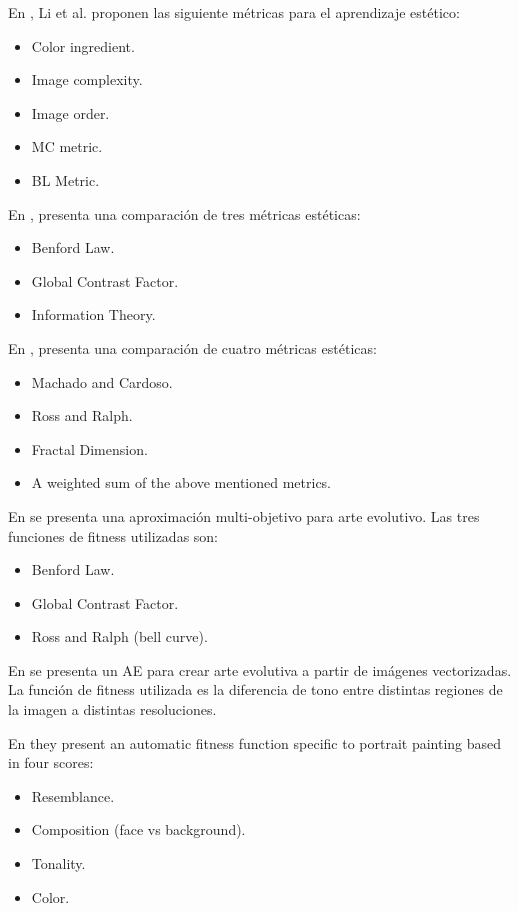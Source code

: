 \documentclass[conference]{IEEEtran}
\begin{document}
En \cite{li2012investigating}, Li et al. proponen las siguiente métricas para el aprendizaje estético:
\begin{itemize}
	\item Color ingredient.
	\item Image complexity.
	\item Image order.
	\item MC metric.
	\item BL Metric.
\end{itemize}

En \cite{den2010using}, presenta una comparación de tres métricas estéticas:
\begin{itemize}
	\item Benford Law.
	\item Global Contrast Factor.
	\item Information Theory.
\end{itemize}

En \cite{den2010comparing}, presenta una comparación de cuatro métricas estéticas:
\begin{itemize}
	\item Machado and Cardoso.
	\item Ross and Ralph.
	\item Fractal Dimension.
	\item A weighted sum of the above mentioned metrics.
\end{itemize}

En \cite{den2011evolving} se presenta una aproximación multi-objetivo para arte evolutivo. Las tres funciones de fitness utilizadas son:
\begin{itemize}
	\item Benford Law.
	\item Global Contrast Factor.
	\item Ross and Ralph (bell curve).
\end{itemize}

En \cite{den2012evolving} se presenta un AE para crear arte evolutiva a partir de imágenes vectorizadas. La función de fitness utilizada es la diferencia de tono entre  distintas regiones de la imagen a distintas resoluciones.

En \cite{dipaola2009incorporating} they present an automatic fitness function specific to portrait painting based in four scores:
\begin{itemize}
	\item Resemblance.
	\item Composition (face vs background).
	\item Tonality.
	\item Color.
\end{itemize}
\end{document}
